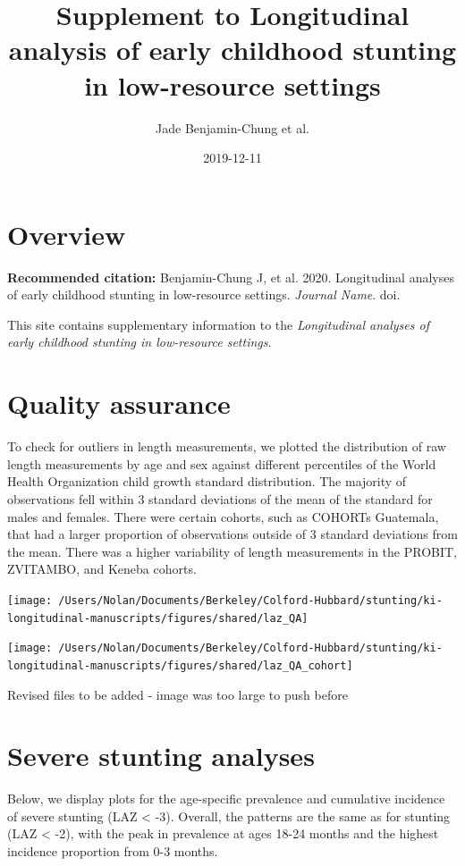 \documentclass[9pt,]{book}
\title{Supplement to Longitudinal analysis of early childhood stunting in
low-resource settings}
\author{Jade Benjamin-Chung et al.}
\date{2019-12-11}
\begin{document}
\maketitle

{
\setcounter{tocdepth}{1}
\tableofcontents
}
\chapter{Overview}\label{overview}

\textbf{Recommended citation:} Benjamin-Chung J, et al. 2020.
Longitudinal analyses of early childhood stunting in low-resource
settings. \emph{Journal Name}. doi.

This site contains supplementary information to the \emph{Longitudinal
analyses of early childhood stunting in low-resource settings}.

\chapter{Quality assurance}\label{QA}

\raggedright

To check for outliers in length measurements, we plotted the
distribution of raw length measurements by age and sex against different
percentiles of the World Health Organization child growth standard
distribution. The majority of observations fell within 3 standard
deviations of the mean of the standard for males and females. There were
certain cohorts, such as COHORTs Guatemala, that had a larger proportion
of observations outside of 3 standard deviations from the mean. There
was a higher variability of length measurements in the PROBIT, ZVITAMBO,
and Keneba cohorts.

\texttt{[image: /Users/Nolan/Documents/Berkeley/Colford-Hubbard/stunting/ki-longitudinal-manuscripts/figures/shared/laz\_QA]}

\texttt{[image: /Users/Nolan/Documents/Berkeley/Colford-Hubbard/stunting/ki-longitudinal-manuscripts/figures/shared/laz\_QA\_cohort]}

Revised files to be added - image was too large to push before

\chapter{Severe stunting analyses}\label{severe-stunting}

\raggedright

Below, we display plots for the age-specific prevalence and cumulative
incidence of severe stunting (LAZ \textless{} -3). Overall, the patterns
are the same as for stunting (LAZ \textless{} -2), with the peak in
prevalence at ages 18-24 months and the highest incidence proportion
from 0-3 months.
\end{document}
